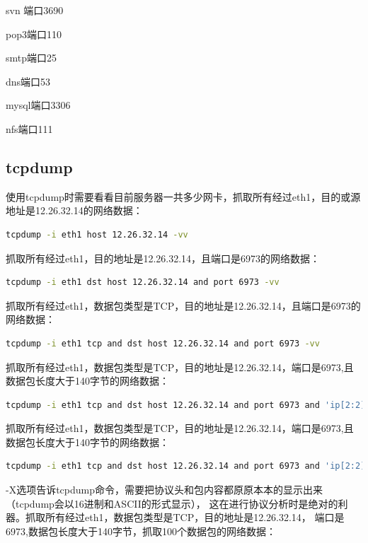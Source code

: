 \documentclass{book}
\begin{document}
svn 端口3690

pop3端口110

smtp端口25

dns端口53

mysql端口3306

nfs端口111

\subsection{tcpdump}

使用tcpdump时需要看看目前服务器一共多少网卡，抓取所有经过eth1，目的或源地址是12.26.32.14的网络数据：

\begin{lstlisting}[language=Bash]
tcpdump -i eth1 host 12.26.32.14 -vv
\end{lstlisting}

抓取所有经过eth1，目的地址是12.26.32.14，且端口是6973的网络数据：

\begin{lstlisting}[language=Bash]
tcpdump -i eth1 dst host 12.26.32.14 and port 6973 -vv
\end{lstlisting}

抓取所有经过eth1，数据包类型是TCP，目的地址是12.26.32.14，且端口是6973的网络数据：

\begin{lstlisting}[language=Bash]
tcpdump -i eth1 tcp and dst host 12.26.32.14 and port 6973 -vv
\end{lstlisting}

抓取所有经过eth1，数据包类型是TCP，目的地址是12.26.32.14，端口是6973,且数据包长度大于140字节的网络数据：

\begin{lstlisting}[language=Bash]
tcpdump -i eth1 tcp and dst host 12.26.32.14 and port 6973 and 'ip[2:2]>140' -vv
\end{lstlisting}

抓取所有经过eth1，数据包类型是TCP，目的地址是12.26.32.14，端口是6973,且数据包长度大于140字节的网络数据：

\begin{lstlisting}[language=Bash]
tcpdump -i eth1 tcp and dst host 12.26.32.14 and port 6973 and 'ip[2:2]>140' -vv -X
\end{lstlisting}

-X选项告诉tcpdump命令，需要把协议头和包内容都原原本本的显示出来（tcpdump会以16进制和ASCII的形式显示），
这在进行协议分析时是绝对的利器。抓取所有经过eth1，数据包类型是TCP，目的地址是12.26.32.14，
端口是6973,数据包长度大于140字节，抓取100个数据包的网络数据：
\end{document}
